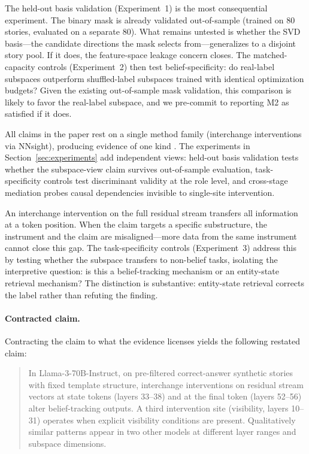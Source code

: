 \documentclass[11pt]{article}
\begin{document}
The held-out basis validation (Experiment~1) is the most consequential experiment. The binary mask is already validated out-of-sample (trained on 80 stories, evaluated on a separate 80). What remains untested is whether the SVD basis---the candidate directions the mask selects from---generalizes to a disjoint story pool. If it does, the feature-space leakage concern closes. The matched-capacity controls (Experiment~2) then test belief-specificity: do real-label subspaces outperform shuffled-label subspaces trained with identical optimization budgets? Given the existing out-of-sample mask validation, this comparison is likely to favor the real-label subspace, and we pre-commit to reporting M2 as satisfied if it does.

All claims in the paper rest on a single method family (interchange interventions via NNsight), producing evidence of one kind \citep{tower2026mechviews}. The experiments in Section~\ref{sec:experiments} add independent views: held-out basis validation tests whether the subspace-view claim survives out-of-sample evaluation, task-specificity controls test discriminant validity at the role level, and cross-stage mediation probes causal dependencies invisible to single-site intervention.

An interchange intervention on the full residual stream transfers all information at a token position. When the claim targets a specific substructure, the instrument and the claim are misaligned---more data from the same instrument cannot close this gap. The task-specificity controls (Experiment~3) address this by testing whether the subspace transfers to non-belief tasks, isolating the interpretive question: is this a belief-tracking mechanism or an entity-state retrieval mechanism? The distinction is substantive: entity-state retrieval corrects the label rather than refuting the finding.

\paragraph{Contracted claim.}
Contracting the claim to what the evidence licenses \citep{tower2026mechref} yields the following restated claim:

\begin{quote}
In Llama-3-70B-Instruct, on pre-filtered correct-answer synthetic stories with fixed template structure, interchange interventions on residual stream vectors at state tokens (layers 33--38) and at the final token (layers 52--56) alter belief-tracking outputs. A third intervention site (visibility, layers 10--31) operates when explicit visibility conditions are present. Qualitatively similar patterns appear in two other models at different layer ranges and subspace dimensions.
\end{quote}
\end{document}
